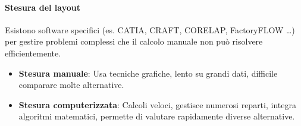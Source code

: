 \paragraph{Stesura del layout} Esistono software specifici (es. CATIA, CRAFT, CORELAP, FactoryFLOW \dots) per gestire problemi complessi che il calcolo manuale non può risolvere efficientemente.
\begin{itemize}
    \item \textbf{Stesura manuale}: Usa tecniche grafiche, lento su grandi dati, difficile comparare molte alternative.
    \item \textbf{Stesura computerizzata}: Calcoli veloci, gestisce numerosi reparti, integra algoritmi matematici, permette di valutare rapidamente diverse alternative.
\end{itemize}
